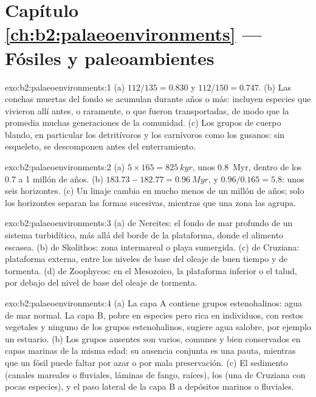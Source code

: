 \section*{Capítulo \ref{ch:b2:palaeoenvironments} --- Fósiles y paleoambientes}

\begin{solution}{exo:b2:palaeoenvironments:1}
(a) $112/135 = 0.830$ y $112/150 = 0.747$. (b) Las conchas muertas del fondo se acumulan durante años
o más: incluyen especies que vivieron allí antes, o raramente, o que fueron transportadas, de modo que la
 promedia muchas generaciones de la comunidad. (c) Los grupos de cuerpo blando, en
particular los detritívoros y los carnívoros como los gusanos: sin esqueleto, se descomponen antes del enterramiento.
\end{solution}

\begin{solution}{exo:b2:palaeoenvironments:2}
(a) $5 \times 165 = \qty{825}{kyr}$, unos \qty{0.8}{Myr}, dentro de los 0.7 a 1 millón de años.
(b) $183.73 - 182.77 = \qty{0.96}{Myr}$, y $0.96/0.165 = 5.8$: unos seis horizontes. (c) Un
linaje cambia en mucho menos de un millón de años; solo los horizontes separan las formas
sucesivas, mientras que una zona las agrupa.
\end{solution}

\begin{solution}{exo:b2:palaeoenvironments:3}
(a)  de Nereites: el fondo de mar profundo de un sistema turbidítico, más allá del borde de la plataforma, donde
el alimento escasea. (b)  de Skolithos: zona intermareal o playa sumergida. (c)  de Cruziana:
plataforma externa, entre los niveles de base del oleaje de buen tiempo y de tormenta. (d)  de Zoophycos: en el
Mesozoico, la plataforma inferior o el talud, por debajo del nivel de base del oleaje de tormenta.
\end{solution}

\begin{solution}{exo:b2:palaeoenvironments:4}
(a) La capa A contiene grupos estenohalinos: agua de mar normal. La capa B, pobre en especies pero rica en
individuos, con restos vegetales y ninguno de los grupos estenohalinos, sugiere agua salobre, por
ejemplo un estuario. (b) Los grupos ausentes son varios, comunes y bien conservados en capas marinas
de la misma edad: su ausencia conjunta es una pauta, mientras que un fósil puede faltar por azar o
por mala preservación. (c) El sedimento (canales mareales o fluviales, láminas de fango, raíces), los
 (una  de Cruziana con pocas especies), y el paso lateral de la capa B
a depósitos marinos o fluviales.
\end{solution}

